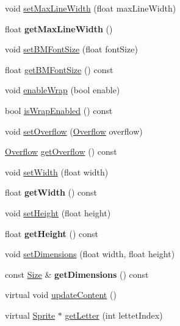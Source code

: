 \begin{DoxyCompactItemize}
\item 
void \hyperlink{classLabel_ad7bd1d7f371a961f4c03c36ee31357b6}{set\+Max\+Line\+Width} (float max\+Line\+Width)
\item 
\mbox{\label{classLabel_a35f9703a7000aef536bef05f3d853358}} 
float {\bfseries get\+Max\+Line\+Width} ()
\item 
void \hyperlink{classLabel_a3d5451ed32ff33ef8de937ace917531d}{set\+B\+M\+Font\+Size} (float font\+Size)
\item 
float \hyperlink{classLabel_a296763fd55fbde90fdec27bbc563a119}{get\+B\+M\+Font\+Size} () const
\item 
void \hyperlink{classLabel_aff268f12033618164c424d7fd24bc94f}{enable\+Wrap} (bool enable)
\item 
bool \hyperlink{classLabel_a1d6375fbdbcea18a4055f53520ea5dd1}{is\+Wrap\+Enabled} () const
\item 
void \hyperlink{classLabel_a50e5693d5ad8c240aa7178a000ad5f20}{set\+Overflow} (\hyperlink{classLabel_af7d31998ea743e8ca64eb1a983fa6a4c}{Overflow} overflow)
\item 
\hyperlink{classLabel_af7d31998ea743e8ca64eb1a983fa6a4c}{Overflow} \hyperlink{classLabel_afe15310c5d9d4009bfe544ba9f342490}{get\+Overflow} () const
\item 
void \hyperlink{classLabel_a4f92bf5284beb87cf0315284a9a1c04d}{set\+Width} (float width)
\item 
\mbox{\label{classLabel_ad735a37a0747f4ee413f177d0fea6ea0}} 
float {\bfseries get\+Width} () const
\item 
void \hyperlink{classLabel_a71ad7b5b1bd01d2d903a560cf33f151d}{set\+Height} (float height)
\item 
\mbox{\label{classLabel_a271ba34622aa967dc9871cca3a1fd949}} 
float {\bfseries get\+Height} () const
\item 
void \hyperlink{classLabel_a7e555d440bd15d0cc955c725eedffe4f}{set\+Dimensions} (float width, float height)
\item 
\mbox{\label{classLabel_a2f516e81d58f6f9f2a9e3d4f4725cc30}} 
const \hyperlink{classSize}{Size} \& {\bfseries get\+Dimensions} () const
\item 
virtual void \hyperlink{classLabel_a4c89bb4e6f4fc80a8a19b805b31674b6}{update\+Content} ()
\item 
virtual \hyperlink{classSprite}{Sprite} $\ast$ \hyperlink{classLabel_aa9bdfe420734060b6431848aa23c5b89}{get\+Letter} (int lettet\+Index)

\end{DoxyCompactItemize}
